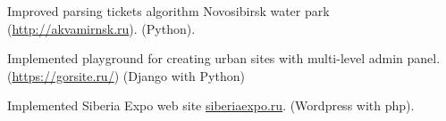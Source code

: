 \begin{cventries}
{\begin{cvitems}
{\begin{flushleft}
            Improved parsing tickets algorithm Novosibirsk water park (\url{http://akvamirnsk.ru}). (Python).\linebreak
        \end{flushleft}
    }
    \item {
        \begin{flushleft}
            Implemented playground for creating urban sites with multi-level admin panel. (\url{https://gorsite.ru/}) (Django with Python)\linebreak
        \end{flushleft}
    }
    \item {
        \begin{flushleft}
            Implemented Siberia Expo web site \url{siberiaexpo.ru}. (Wordpress with php).\linebreak
        \end{flushleft}
    }
\end{cvitems}
}


\end{cventries}
